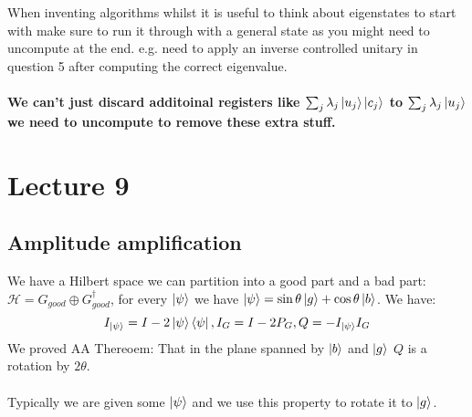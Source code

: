 \documentclass{article}
\begin{document}
When inventing algorithms whilst it is useful to think about eigenstates to start with make sure to run it through with a general state as you might need to uncompute at the end. e.g. need to apply an inverse controlled unitary in question 5 after computing the correct eigenvalue.\\\\
\textbf{We can't just discard additoinal registers like $\sum_j\lambda_j \ket{u_j} \ket{c_j}$ to $\sum_j \lambda_j \ket{u_j}$ we need to uncompute to remove these extra stuff.}
\section{Lecture 9}
\subsection{Amplitude amplification}
We have a Hilbert space we can partition into a good part and a bad part: $\mathcal{H} = G_{good} \oplus G_{good}^{\dagger}$, for every $\ket{\psi}$ we have $\ket{\psi} = \sin \theta \ket{g} + \cos \theta \ket{b}$. We have:
$$
I_{\ket{\psi}} = I - 2\ket{\psi} \bra{\psi}, I_G = I - 2 P_G, Q = - I_{\ket{\psi}} I_G
$$
We proved AA Thereoem: That in the plane spanned by $\ket{b}$ and $\ket{g}$ $Q$ is a rotation by $2\theta$.\\\\
Typically we are given some $\ket{\psi}$ and we use this property to rotate it to $\ket{g}$.
\end{document}
